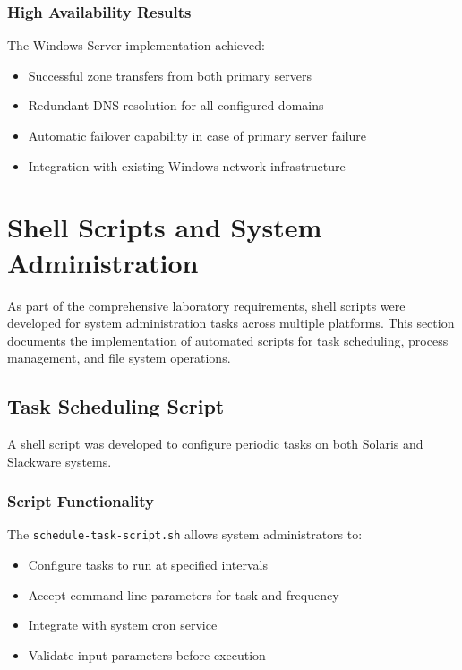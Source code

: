 \documentclass[12pt,a4paper]{article}
\begin{document}
\subsubsection{High Availability Results}
The Windows Server implementation achieved:
\begin{itemize}
    \item Successful zone transfers from both primary servers
    \item Redundant DNS resolution for all configured domains
    \item Automatic failover capability in case of primary server failure
    \item Integration with existing Windows network infrastructure
\end{itemize}

\section{Shell Scripts and System Administration}\label{sec:shell-scripts}

As part of the comprehensive laboratory requirements, shell scripts were developed for system administration tasks across multiple platforms. This section documents the implementation of automated scripts for task scheduling, process management, and file system operations.

\subsection{Task Scheduling Script}\label{subsec:task-scheduling}

A shell script was developed to configure periodic tasks on both Solaris and Slackware systems.

\subsubsection{Script Functionality}
The \texttt{schedule-task-script.sh} allows system administrators to:
\begin{itemize}
    \item Configure tasks to run at specified intervals
    \item Accept command-line parameters for task and frequency
    \item Integrate with system cron service
    \item Validate input parameters before execution
\end{itemize}
\end{document}
